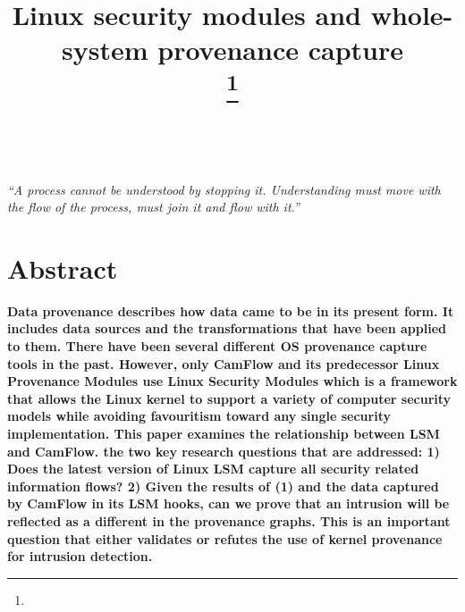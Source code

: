 \documentclass{IEEEtran}
\begin{document}
\title{Linux security modules and whole-system provenance capture\\
{\footnotesize}
\thanks{}
}

\author{ \\


}

\maketitle
 \textit{“A process cannot be understood by stopping it. Understanding must move with the flow of the process, must join it and flow with it.”} 
\section*{Abstract}
    
     \vskip 0.2in
	 \textbf{Data provenance describes how data came to be in its present form. It includes data sources and the transformations that have been applied to them. There have been several different OS provenance capture tools in the past. However, only CamFlow and its predecessor Linux Provenance Modules use Linux Security Modules which is a  framework  that allows the Linux kernel to support a variety of computer security models while avoiding favouritism toward any single security implementation. This paper examines the relationship between LSM and CamFlow. the two key research questions that are addressed: 1) Does
	 the latest version of Linux LSM capture all security related information flows? 2) Given the results of (1) and the data captured by CamFlow in its LSM hooks, can we prove that an intrusion will be reflected as a different in the provenance graphs. This is an important question that either validates or refutes the use of kernel provenance for intrusion detection.}










\end{document}
